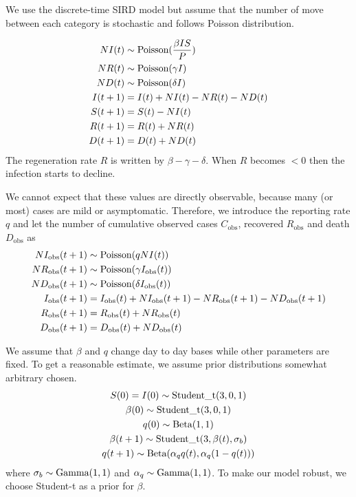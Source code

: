 \documentclass{amsart}
\begin{document}
We use the discrete-time SIRD model but assume that the number of move between each category is stochastic and follows Poisson distribution.

\begin{align}
 NI(t) &\sim \textup{Poisson}(\frac{\beta I S}{P})\\
 NR(t) &\sim \textup{Poisson}(\gamma I)\\
 ND(t) &\sim \textup{Poisson}(\delta I)\\
 I(t+1) &= I(t) + NI(t) - NR(t) - ND(t)\\
 S(t+1) &= S(t) - NI(t)\\
 R(t+1) &= R(t) + NR(t)\\
 D(t+1) &= D(t) + ND(t)
\end{align}
The regeneration rate $R$ is written by $\beta - \gamma - \delta$.
When $R$ becomes $<0$ then the infection starts to decline.

We cannot expect that these values are directly observable, because many (or most) cases are mild or asymptomatic.
Therefore, we introduce the reporting rate $q$ and let the number of cumulative observed cases $C_{\text{obs}}$, recovered $R_{\text{obs}}$ and death $D_{\text{obs}}$ as
\begin{align}
 NI_{\text{obs}}(t+1) &\sim \textup{Poisson}(q NI(t))\\
 NR_{\text{obs}}(t+1) &\sim \textup{Poisson}(\gamma I_{\text{obs}}(t))\\
 ND_{\text{obs}}(t+1) &\sim \textup{Poisson}(\delta I_{\text{obs}}(t))\\
 I_{\text{obs}}(t+1) &= I_{\text{obs}}(t) + NI_{\text{obs}}(t+1) - NR_{\text{obs}}(t+1) - ND_{\text{obs}}(t+1)\\
 R_{\text{obs}}(t+1) &= R_{\text{obs}}(t) + NR_{\text{obs}}(t)\\
 D_{\text{obs}}(t+1) &= D_{\text{obs}}(t) + ND_{\text{obs}}(t)
\end{align}

We assume that $\beta$ and $q$ change day to day bases while other parameters are fixed.
To get a reasonable estimate, we assume prior distributions somewhat arbitrary chosen.
\begin{gather}
 S(0) = I(0) \sim \textup{Student\_t}(3, 0, 1)\\
 \beta(0) \sim \textup{Student\_t}(3, 0, 1)\\
 q(0) \sim \textup{Beta}(1, 1)\\
 \beta(t+1) \sim \textup{Student\_t}(3, \beta(t), \sigma_b)\\
 q(t+1) \sim \textup{Beta}(\alpha_q q(t), \alpha_q(1 - q(t)))
\end{gather}
where $\sigma_b \sim \textup{Gamma}(1, 1)$ and $\alpha_q \sim \textup{Gamma}(1, 1)$.
To make our model robust, we choose Student-t as a prior for $\beta$.
\end{document}
